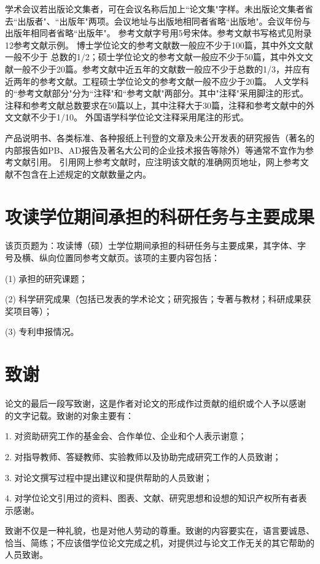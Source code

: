     学术会议若出版论文集者，可在会议名称后加上``论文集"字样。未出版论文集者省去``出版者"、``出版年"两项。会议地址与出版地相同者省略``出版地"。会议年份与出版年相同者省略``出版年"。
参考文献字号用5号宋体。参考文献书写格式见附录12参考文献示例。
博士学位论文的参考文献数一般应不少于100篇，其中外文文献一般不少于
总数的1/2；硕士学位论文的参考文献一般应不少于50篇，其中外文文献一般不少于20篇。参考文献中近五年的文献数一般应不少于总数的1/3，并应有近两年的参考文献。工程硕士学位论文的参考文献一般不应少于20篇。
人文学科的``参考文献部分"分为``注释"和``参考文献"两部分。其中"注释"采用脚注的形式。注释和参考文献总数要求在50篇以上，其中注释大于30篇，注释和参考文献中的外文文献不少于1/10。
外国语学科学位论文注释采用尾注的形式。

    产品说明书、各类标准、各种报纸上刊登的文章及未公开发表的研究报告（著名的内部报告如PB、AD报告及著名大公司的企业技术报告等除外）等通常不宜作为参考文献引用。
引用网上参考文献时，应注明该文献的准确网页地址，网上参考文献不包含在上述规定的文献数量之内。


\section{攻读学位期间承担的科研任务与主要成果}\label{appendixA-9}

该页页题为：攻读博（硕）士学位期间承担的科研任务与主要成果，其字体、字
号及横、纵向位置同参考文献页。该项的主要内容包括：

(1)	承担的研究课题；

(2)	科学研究成果（包括已发表的学术论文；研究报告；专著与教材；科研成果获奖项目等）；

(3)	专利申报情况。

\section{致谢}\label{appendixA-10}

论文的最后一段写致谢，这是作者对论文的形成作过贡献的组织或个人予以感谢
的文字记载。致谢的对象主要有：

1.	对资助研究工作的基金会、合作单位、企业和个人表示谢意；

2.	对指导教师、答疑教师、实验教师以及协助完成研究工作的人员致谢；

3.	对论文撰写过程中提出建议和提供帮助的人员致谢；

4.	对学位论文引用过的资料、图表、文献、研究思想和设想的知识产权所有者表示感谢。

致谢不仅是一种礼貌，也是对他人劳动的尊重。致谢的内容要实在，语言要诚恳、恰当、简练；不应该借学位论文完成之机，对提供过与论文工作无关的其它帮助的人员致谢。

